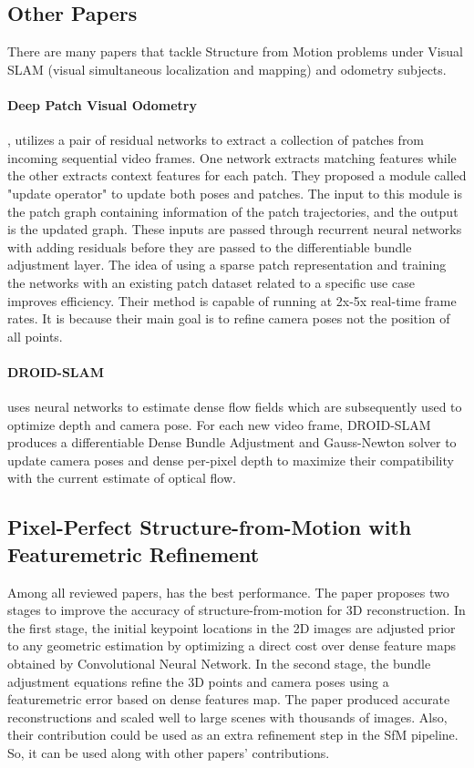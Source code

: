 \documentclass[11pt]{article}
\begin{document}
    \subsection{Other Papers}
    There are many papers that tackle Structure from Motion problems under Visual SLAM (visual simultaneous
    localization and mapping) and odometry subjects.

    \paragraph{Deep Patch Visual Odometry} \cite{teed2022deep}, utilizes a pair of residual networks to extract
    a collection of patches from incoming sequential video frames. One network extracts matching features while
    the other extracts context features for each patch. They proposed a module called "update operator" to update both
    poses and patches. The input to this module is the patch graph containing information of the patch trajectories,
    and the output is the updated graph. These inputs are passed through recurrent neural networks with adding residuals
    before they are passed to the differentiable bundle adjustment layer.
    The idea of using a sparse patch representation and training the networks with an existing patch dataset related
    to a specific use case improves efficiency. Their method is capable of running at 2x-5x real-time frame rates. It is because
    their main goal is to refine camera poses not the position of all points.

    \paragraph{DROID-SLAM} \cite{teed2022droidslam} uses neural networks to estimate dense flow fields which are subsequently
    used to optimize depth and camera pose. For each new video frame, DROID-SLAM produces a differentiable Dense
    Bundle Adjustment and Gauss-Newton solver to update camera poses and dense per-pixel depth to maximize their
    compatibility with the current estimate of optical flow.


    \newpage
    \subsection{Pixel-Perfect Structure-from-Motion with Featuremetric Refinement}
    Among all reviewed papers, \cite{lindenberger2021pixsfm} has the best performance. The paper
    proposes two stages to improve the accuracy of structure-from-motion for 3D reconstruction.
    In the first stage, the initial keypoint locations in the 2D images are adjusted prior to any geometric estimation
    by optimizing a direct cost over dense feature maps obtained by Convolutional Neural Network.
    In the second stage, the bundle adjustment equations refine the 3D points and camera poses using
    a featuremetric error based on dense features map.
    The paper produced accurate reconstructions and scaled well to large scenes with thousands of images.
    Also, their contribution could be used as an extra refinement step in the SfM pipeline. So, it can be used
    along with other papers' contributions.
\end{document}
